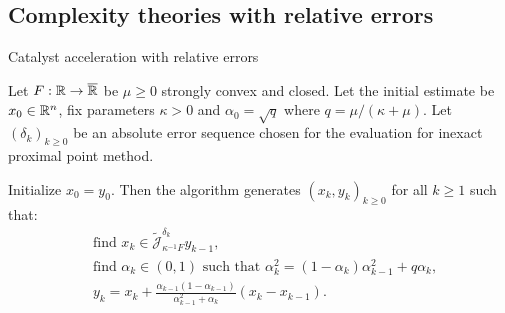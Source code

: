 \documentclass[11pt]{beamer}
\theoremstyle{definition}
\begin{document}
    \subsection{Complexity theories with relative errors}
        \begin{frame}{Catalyst acceleration with relative errors}
            \begin{definition}\label{def:catalyst-relative}
            {\small
                Let $F:\mathbb R \rightarrow \overline {\mathbb R}$ be $\mu \ge 0$ strongly convex and closed. 
                Let the initial estimate be $x_0 \in \mathbb R^n$, fix parameters $\kappa > 0$ and $\alpha_0 = \sqrt{q}$ where $q = \mu/(\kappa + \mu)$. 
                Let $(\delta_k)_{k \ge 0}$ be an absolute error sequence chosen for the evaluation for inexact proximal point method. 
                \begin{tcolorbox}
                    Initialize $x_0 = y_0$. Then the algorithm generates $(x_k, y_k)_{k\ge 0}$ for all $k \ge 1$ such that: 
                    \begin{align*}
                        & \text{find } x_k \in \widetilde{\mathcal J}_{\kappa^{-1}F}^{\delta_k} y_{k - 1}, 
                        \\
                        & \text{find } \alpha_k \in (0, 1) \text{ such that } \alpha_k^2 = (1 - \alpha_k)\alpha_{k - 1}^2 + q\alpha_k,
                        \\
                        & 
                        y_{k} = x_k + \frac{\alpha_{k - 1}(1 - \alpha_{k - 1})}{\alpha_{k - 1}^2 + \alpha_k}(x_k - x_{k - 1}). 
                    \end{align*}
                \end{tcolorbox}
            }
            \end{definition}
        \end{frame}
\end{document}
